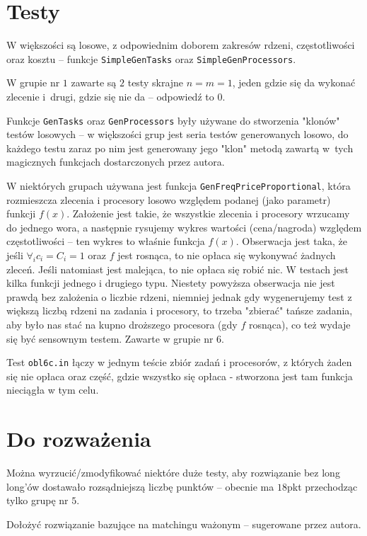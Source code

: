 \documentclass[opr,utf8]{sinol}
\begin{document}
\begin{tasktext}
  \section{Testy}
    W większości są losowe, z odpowiednim doborem zakresów rdzeni, częstotliwości oraz kosztu
    -- funkcje \texttt{SimpleGenTasks} oraz \texttt{SimpleGenProcessors}.

    W grupie nr $1$ zawarte są $2$ testy skrajne $n = m = 1$, jeden gdzie się da wykonać zlecenie
    i~drugi, gdzie się nie da -- odpowiedź to $0$.

    Funkcje \texttt{GenTasks} oraz \texttt{GenProcessors} były używane do stworzenia "klonów"
    testów losowych -- w większości grup jest seria testów generowanych losowo, do każdego
    testu zaraz po nim jest generowany jego "klon" metodą zawartą w~tych magicznych funkcjach
    dostarczonych przez autora.

    W niektórych grupach używana jest funkcja \texttt{GenFreqPriceProportional}, która rozmieszcza
    zlecenia i procesory losowo względem podanej (jako parametr) funkcji $f(x)$. Założenie jest takie,
    że wszystkie zlecenia i procesory wrzucamy do jednego wora, a następnie rysujemy wykres
    wartości (cena/nagroda) względem częstotliwości -- ten wykres to właśnie funkcja $f(x)$.
    Obserwacja jest taka, że jeśli $\forall_i c_i = C_i = 1$ oraz $f$ jest rosnąca, to nie opłaca się wykonywać żadnych zleceń.
    Jeśli natomiast jest malejąca, to nie opłaca się robić nic. W testach jest kilka funkcji
    jednego i drugiego typu. Niestety powyższa obserwacja nie jest prawdą bez zalożenia o liczbie
    rdzeni, niemniej jednak gdy wygenerujemy test z większą liczbą rdzeni na zadania i procesory,
    to trzeba "zbierać" tańsze zadania, aby było nas stać na kupno droższego procesora (gdy $f$ rosnąca),
    co też wydaje się być sensownym testem. Zawarte w grupie nr $6$.

    Test \texttt{obl6c.in} łączy w jednym teście zbiór zadań i procesorów, z których żaden się nie opłaca
    oraz część, gdzie wszystko się opłaca - stworzona jest tam funkcja nieciągła w tym celu.

  \section{Do rozważenia}
    Można wyrzucić/zmodyfikować niektóre duże testy, aby rozwiązanie bez long long'ów dostawało
    rozsądniejszą liczbę punktów -- obecnie ma $18$pkt przechodząc tylko grupę nr $5$.

    Dołożyć rozwiązanie bazujące na matchingu ważonym -- sugerowane przez autora.

  \end{tasktext}
\end{document}
